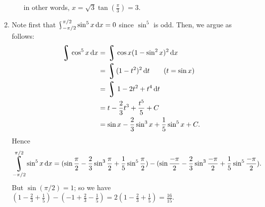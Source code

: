\begin{enumerate}
\begin{enumerate}
            in other words, $ x = \sqrt{3} \tan\left(\frac{\pi}{3}\right) = 3 $.
    \end{enumerate}
  \item Note first that $ \rint^{\pi/2}_{-\pi/2} \sin^5 x \dif{x} = 0 $ since $ \sin^5 $ is odd. Then, we argue as follows:
        \begin{align*}
          \rint \cos^5 x \dif{x} &= \rint \cos x (1 - \sin^2 x)^2 \dif{x}\\
                                 &= \rint (1 - t^2)^2 \dif{t} \qquad\text{($ t = \sin x $)}\\
                                 &= \rint 1 - 2t^2 + t^4 \dif{t}\\
                                 &= t - \frac{2}{3}t^3 + \frac{t^5}{5} + C\\
                                 &= \sin x - \frac{2}{3} \sin^3 x + \frac{1}{5} \sin^5 x + C.
        \end{align*}
        Hence
        \begin{displaymath}
          \rint^{\pi/2}_{-\pi/2} \sin^5 x \dif{x} = (\sin \frac{\pi}{2} - \frac{2}{3} \sin^3 \frac{\pi}{2} + \frac{1}{5} \sin^5 \frac{\pi}{2}) - (\sin \frac{-\pi}{2} - \frac{2}{3} \sin^3 \frac{-\pi}{2} + \frac{1}{5} \sin^5 \frac{-\pi}{2}).
        \end{displaymath}
        But $ \sin (\pi/2) = 1 $; so we have $ (1 - \frac{2}{3} + \frac{1}{5}) - (-1 + \frac{2}{3} - \frac{1}{5}) = 2(1 - \frac{2}{3} + \frac{1}{5}) = \frac{16}{15} $.
\end{enumerate}


